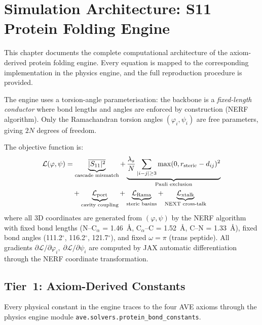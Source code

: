 \chapter{Simulation Architecture: S11 Protein Folding Engine}
\label{ch:protein_sim_architecture}

This chapter documents the complete computational architecture of the axiom-derived protein folding engine.  Every equation is mapped to the corresponding implementation in the physics engine, and the full reproduction procedure is provided.

The engine uses a torsion-angle parameterisation: the backbone is a \emph{fixed-length conductor} where bond lengths and angles are enforced by construction (NERF algorithm).  Only the Ramachandran torsion angles $(\varphi_i, \psi_i)$ are free parameters, giving $2N$ degrees of freedom.

The objective function is:
\begin{align}
    \mathcal{L}(\varphi, \psi) &= \underbrace{\overline{|S_{11}|^2}}_{\text{cascade mismatch}} + \underbrace{\frac{\lambda_s}{N} \sum_{|i-j|\geq 3} \max(0, r_{\text{steric}} - d_{ij})^2}_{\text{Pauli exclusion}} \notag \\
    &\quad + \underbrace{\mathcal{L}_{\text{port}}}_{\text{cavity coupling}} + \underbrace{\mathcal{L}_{\text{Rama}}}_{\text{steric basins}} + \underbrace{\mathcal{L}_{\text{xtalk}}}_{\text{NEXT cross-talk}}
    \label{eq:total_loss}
\end{align}
where all 3D coordinates are generated from $(\varphi, \psi)$ by the NERF algorithm with fixed bond lengths (N--C$_\alpha$ = 1.46~\AA, C$_\alpha$--C = 1.52~\AA, C--N = 1.33~\AA), fixed bond angles (111.2$^\circ$, 116.2$^\circ$, 121.7$^\circ$), and fixed $\omega = \pi$ (trans peptide).  All gradients $\partial\mathcal{L}/\partial\varphi_i,\; \partial\mathcal{L}/\partial\psi_i$ are computed by JAX automatic differentiation through the NERF coordinate transformation.

\section{Tier~1: Axiom-Derived Constants}

Every physical constant in the engine traces to the four AVE axioms through the physics engine module \texttt{ave.solvers.protein\_bond\_constants}.


